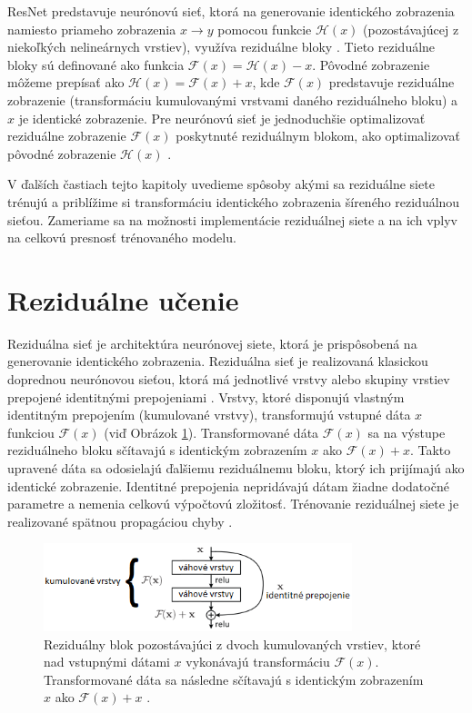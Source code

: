 ResNet predstavuje neurónovú sieť, ktorá na generovanie identického zobrazenia namiesto priameho zobrazenia $x\rightarrow y$ pomocou funkcie $\mathcal{H}(x)$ (pozostávajúcej z niekoľkých nelineárnych vrstiev), využíva reziduálne bloky \cite{Wu2017}. Tieto reziduálne bloky sú definované ako funkcia $\mathcal{F}(x) = \mathcal{H}(x) - x$. Pôvodné zobrazenie môžeme prepísať ako $\mathcal{H}(x) = \mathcal{F}(x) + x$, kde $\mathcal{F}(x)$ predstavuje reziduálne zobrazenie (transformáciu kumulovanými vrstvami daného reziduálneho bloku) a $x$ je identické zobrazenie. Pre neurónovú sieť je jednoduchšie optimalizovať reziduálne zobrazenie $\mathcal{F}(x)$ poskytnuté reziduálnym blokom, ako optimalizovať pôvodné zobrazenie $\mathcal{H}(x)$ \cite{Wu2017}.

V ďalších častiach tejto kapitoly uvedieme spôsoby akými sa reziduálne siete trénujú a priblížime si transformáciu identického zobrazenia šíreného reziduálnou sieťou. Zameriame sa na možnosti implementácie reziduálnej siete a na ich vplyv na celkovú presnosť trénovaného modelu.

\section{Reziduálne učenie}
\label{residual_learning}

Reziduálna sieť je architektúra neurónovej siete, ktorá je prispôsobená na generovanie identického zobrazenia. Reziduálna sieť je realizovaná klasickou doprednou neurónovou sieťou, ktorá má jednotlivé vrstvy alebo skupiny vrstiev prepojené identitnými prepojeniami \cite{Wu2017}. Vrstvy, ktoré disponujú vlastným identitným prepojením (kumulované vrstvy), transformujú vstupné dáta $x$ funkciou $\mathcal{F}(x)$ (viď Obrázok \ref{fig:residualBlock}). Transformované dáta $\mathcal{F}(x)$ sa na výstupe reziduálneho bloku sčítavajú s identickým zobrazením $x$ ako $\mathcal{F}(x)+x$. Takto upravené dáta sa odosielajú ďalšiemu reziduálnemu bloku, ktorý ich prijímajú ako identické zobrazenie. Identitné prepojenia nepridávajú dátam žiadne dodatočné parametre a nemenia celkovú výpočtovú zložitosť. Trénovanie reziduálnej siete je realizované spätnou propagáciou chyby \cite{Wu2017}.

\begin{figure}

\centerline{\includegraphics[width=0.8\textwidth]{images/residualBlock}}
\caption[Reziduálny blok]{Reziduálny blok pozostávajúci z dvoch kumulovaných vrstiev, ktoré nad vstupnými dátami $x$ vykonávajú transformáciu $\mathcal{F}(x)$. Transformované dáta sa následne sčítavajú s identickým zobrazením $x$ ako $\mathcal{F}(x) + x$ \cite{Wu2017}.}
\label{fig:residualBlock}
\end{figure}

